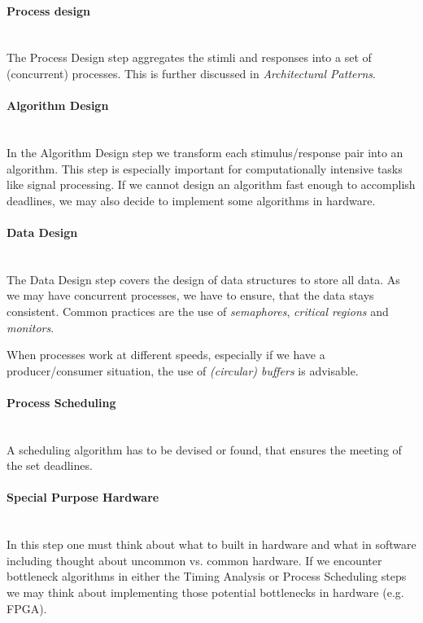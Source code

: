 \documentclass[10pt,a4paper,titlepage,draft]{article} %
\begin{document}
\paragraph{Process design} \ \\
The Process Design step aggregates the stimli and responses into a set of (concurrent) processes.
This is further discussed in \emph{Architectural Patterns}.

\paragraph{Algorithm Design} \ \\
In the Algorithm Design step we transform each stimulus/response pair into an algorithm.
This step is especially important for computationally intensive tasks like signal processing.
If we cannot design an algorithm fast enough to accomplish deadlines, we may also decide to implement some algorithms in hardware.

\paragraph{Data Design} \ \\
The Data Design step covers the design of data structures to store all data.
As we may have concurrent processes, we have to ensure, that the data stays consistent.
Common practices are the use of \emph{semaphores}, \emph{critical regions} and \emph{monitors}.

When processes work at different speeds, especially if we have a pro\-du\-cer/con\-sumer situation, the use of \emph{(circular) buffers} is advisable.

\paragraph{Process Scheduling} \ \\
A scheduling algorithm has to be devised or found, that ensures the meeting of the set deadlines.

\paragraph{Special Purpose Hardware} \ \\
In this step one must think about what to built in hardware and what in software including thought about uncommon vs. common hardware.
If we encounter bottleneck algorithms in either the Timing Analysis or Process Scheduling steps we may think about implementing those potential bottlenecks in hardware (e.g. FPGA).
\end{document}
